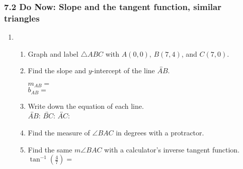 \documentclass[12pt, twoside]{article}
\begin{document}
\subsubsection*{7.2 Do Now: Slope and the tangent function, similar triangles}
  \begin{enumerate}
  \item \begin{enumerate}
    \item Graph and label $\triangle ABC$ with $A(0,0)$, $B(7,4)$, and $C(7,0)$.
    \begin{center}
    \end{center}
    \item Find the slope and $y$-intercept of the line $\overleftrightarrow{AB}$.
      \begin{multicols}{2}
        $m_{AB}=$ \\
        $b_{AB}=$
      \end{multicols} \vspace{0.5cm}
    \item Write down the equation of each line. \\[0.5cm]
      $\overleftrightarrow{AB}$: \hfill
      $\overleftrightarrow{BC}$: \hfill
      $\overleftrightarrow{AC}$: \hspace{2cm}
    \vspace{2cm}
    \item Find the measure of $\angle BAC$ in degrees with a protractor. \vspace{0.5cm}
    \item Find the same $m\angle BAC$ with a calculator's inverse tangent function.\\[0.5cm]
    $\displaystyle \tan^{-1}(\frac{4}{7})=$
    \vspace{2cm}
  \end{enumerate}



\end{enumerate}
\end{document}
